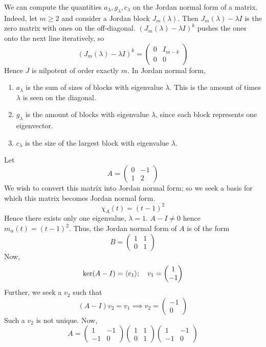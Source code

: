 \begin{remark}
	We can compute the quantities \( a_\lambda, g_\lambda, c_\lambda \) on the Jordan normal form of a matrix.
	Indeed, let \( m \geq 2 \) and consider a Jordan block \( J_m(\lambda) \).
	Then \( J_m(\lambda) - \lambda I \) is the zero matrix with ones on the off-diagonal.
	\( (J_m(\lambda) - \lambda I)^k \) pushes the ones onto the next line iteratively, so
	\[
		(J_m(\lambda) - \lambda I)^k = \begin{pmatrix}
			0 & I_{m-k} \\
			0 & 0
		\end{pmatrix}
	\]
	Hence \( J \) is nilpotent of order exactly \( m \).
	In Jordan normal form,
	\begin{enumerate}
		\item \( a_\lambda \) is the sum of sizes of blocks with eigenvalue \( \lambda \).
		      This is the amount of times \( \lambda \) is seen on the diagonal.
		\item \( g_\lambda \) is the amount of blocks with eigenvalue \( \lambda \), since each block represents one eigenvector.
		\item \( c_\lambda \) is the size of the largest block with eigenvalue \( \lambda \).
	\end{enumerate}
\end{remark}
\begin{example}
	Let
	\[
		A = \begin{pmatrix}
			0 & -1 \\
			1 & 2
		\end{pmatrix}
	\]
	We wish to convert this matrix into Jordan normal form; so we seek a basis for which this matrix becomes Jordan normal form.
	\[
		\chi_A(t) = (t-1)^2
	\]
	Hence there exists only one eigenvalue, \( \lambda = 1 \).
	\( A - I \neq 0 \) hence \( m_\alpha(t) = (t-1)^2 \).
	Thus, the Jordan normal form of \( A \) is of the form
	\[
		B = \begin{pmatrix}
			1 & 1 \\
			0 & 1
		\end{pmatrix}
	\]
	Now,
	\[
		\ker(A - I) = \langle{} v_1 \rangle;\quad v_1 = \begin{pmatrix}
			1 \\ -1
		\end{pmatrix}
	\]
	Further, we seek a \( v_2 \) such that
	\[
		(A - I)v_2 = v_1 \implies v_2 = \begin{pmatrix}
			-1 \\ 0
		\end{pmatrix}
	\]
	Such a \( v_2 \) is not unique.
	Now,
	\[
		A = \begin{pmatrix}
			1  & -1 \\
			-1 & 0
		\end{pmatrix}
		\begin{pmatrix}
			1 & 1 \\
			0 & 1
		\end{pmatrix}
		\begin{pmatrix}
			1  & -1 \\
			-1 & 0
		\end{pmatrix}
	\]
\end{example}
